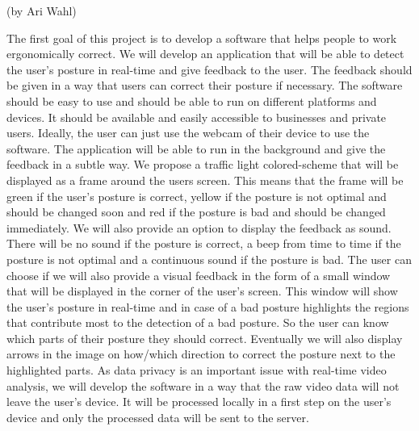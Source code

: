(by Ari Wahl)

\p
The first goal of this project is to develop a software that helps people to work
ergonomically correct. We will develop an application that will be able to detect the user's posture in real-time
and give feedback to the user. The feedback should be given in a way that users
can correct their posture if necessary. The software should be easy to use and should be able to run on 
different platforms and devices. It should be available and easily accessible to businesses and private users. Ideally, the user
can just use the webcam of their device to use the software. The application will be able to run in the background
and give the feedback in a subtle way. We propose a traffic light colored-scheme that will be displayed as a frame
around the users screen. This means that the frame will be green if the user's posture is correct, yellow if the posture is not optimal 
and should be changed soon and red if the posture is bad and should be changed immediately. 
We will also provide an option to display the feedback as sound. There will be no sound if the posture is correct, a
beep from time to time if the posture is not optimal and a continuous sound if the posture is bad. 
The user can choose if we will also provide a visual feedback in the form of a small window that will be displayed in the corner of the user's screen.
This window will show the user's posture in real-time and in case of a bad posture highlights the regions that contribute most to the detection of a bad posture.
So the user can know which parts of their posture they should correct. Eventually we will also display arrows
in the image on how/which direction to correct the posture next to the highlighted parts.
As data privacy is an important issue with real-time video analysis, we will develop the software in a way that the raw video data
will not leave the user's device. It will be processed locally in a first step on the user's device and only the processed data will be sent to the server.

